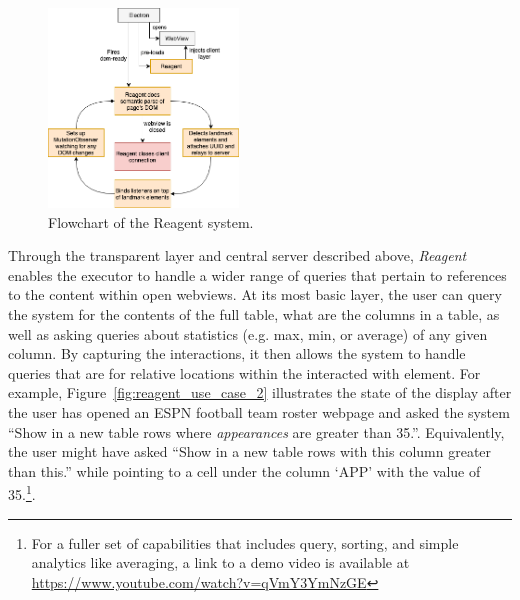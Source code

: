 \begin{figure}
\centering
\includegraphics[width=0.45\textwidth]{chapters/03_reagent/figures/reagent.png}
\caption{Flowchart of the Reagent system.}
\label{fig:reagent}
\end{figure}

Through the transparent layer and central server described above, \textit{Reagent} enables
the executor to handle a wider range of queries that pertain to references
to the content within open webviews. At its most basic layer, the user can
query the system for the contents of the full table, what are the columns in a
table, as well as asking queries about statistics (e.g. max, min, or average)
of any given column. By capturing the interactions, it then allows the system
to handle queries that are for relative locations within the interacted with
element. For example, Figure~\ref{fig:reagent_use_case_2} illustrates the state of the
display after the user has opened an ESPN football team roster webpage and
asked the system ``Show in a new table rows where \textit{appearances} are
greater than 35.''. Equivalently, the user might have asked ``Show in a new
table rows with this column greater than this.'' while pointing to a cell
under the column `APP' with the value of 35.\footnote{For a fuller set of
capabilities that includes query, sorting, and simple analytics like averaging,
a link to a demo video is available at
\url{https://www.youtube.com/watch?v=qVmY3YmNzGE}}.
